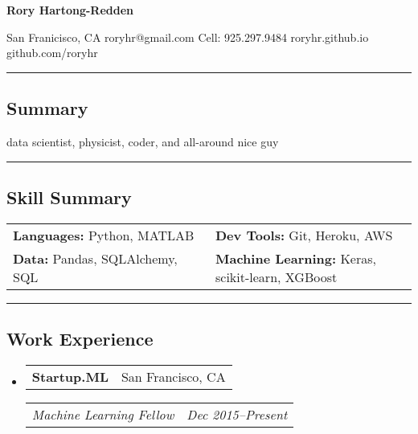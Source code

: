 \documentclass[10pt,letterpaper]{article}
\makeatletter
\newenvironment{indentsection}[1]%
{\begin{list}{}%
	{\setlength{\leftmargin}{#1}}%
	\item[]%
}
{\end{list}}
\newcommand{\headerrow}[2]
{\begin{tabular*}{\linewidth}{l@{\extracolsep{\fill}}r}
	#1 &
	#2 \\
\end{tabular*}}
\makeatother
\begin{document}
{\raggedright \LARGE \bf Rory Hartong-Redden\\}

{\raggedleft 
San Franicisco, CA \textbar\/ 
roryhr@gmail.com \textbar\/ 
Cell: 925.297.9484 \textbar\/ 
roryhr.github.io \textbar\/   
github.com/roryhr\\}
\hrule

\subsection*{Summary}

\vspace{-0.4em}

\begin{centering}  
data scientist, physicist, coder, and all-around nice guy\\
\end{centering}

\vspace{0.4em}

\hrule
\subsection*{Skill Summary}
\begin{indentsection}{\parindent}
\begin{tabular}{p{0.5\linewidth}   p{0.5\linewidth} } 
	\textbf{Languages:}  Python, MATLAB 	
	& \textbf{Dev Tools:}  Git, Heroku, AWS \\  

	\textbf{Data:} Pandas, SQLAlchemy, SQL 	
	& \textbf{Machine Learning:}  Keras, scikit-learn, XGBoost  \\
\end{tabular}
\end{indentsection}


\hrule
\subsection*{Work Experience}
\begin{itemize}
	\parskip=-0.1em
	\item
	\headerrow
		{\textbf{Startup.ML}}
		{San Francisco, CA}
	\headerrow
		{\emph{Machine Learning Fellow}}
		{\emph{Dec 2015--Present}}
\end{itemize}
\end{document}
